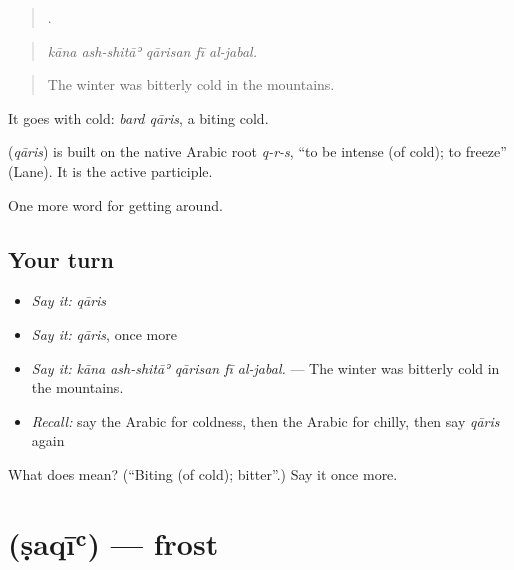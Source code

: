 \begin{quote}
    .
\end{quote}

\begin{quote}
\emph{kāna ash-shitāʾ qārisan fī al-jabal.}
\end{quote}

\begin{quote}
The winter was bitterly cold in the mountains.
\end{quote}

It goes with cold: \emph{bard qāris}, a biting cold.

\begin{cousinweb}
\textbf{} (\emph{qāris}) is built on the native Arabic root \emph{q-r-s}, \textquotedblleft{}to be intense (of cold); to freeze\textquotedblright{} (Lane). It is the active participle.
\end{cousinweb}

\begin{grammarlens}[title={What you've built}]
One more word for getting around.
\end{grammarlens}

\subsection*{Your turn}
\begin{itemize}
\raggedright
  \item \emph{Say it:} \emph{qāris}
  \item \emph{Say it:} \emph{qāris}, once more
  \item \emph{Say it:} \emph{kāna ash-shitāʾ qārisan fī al-jabal.} — The winter was bitterly cold in the mountains.
  \item \emph{Recall:} say the Arabic for coldness, then the Arabic for chilly, then say \emph{qāris} again
\end{itemize}

\begin{tcolorbox}[breakable,colback=teal!4,colframe=teal!35!black,title={Before you move on}]
What does  mean? (\textquotedblleft{}Biting (of cold); bitter\textquotedblright{}.) Say it once more.
\end{tcolorbox}
\section[\texorpdfstring{\ar{صقيع} (ṣaqīʿ)}{صقيع (ṣaqīʿ)}]{ (ṣaqīʿ) — frost}

